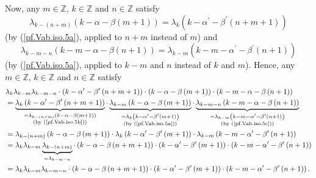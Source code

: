 \documentclass[etingof-lie.tex]{subfiles}
\begin{document}
Now, any $m\in\mathbb{Z}$, $k\in\mathbb{Z}$ and $n\in\mathbb{Z}$ satisfy%
\begin{equation}
\lambda_{k-\left(  n+m\right)  }\left(  k-\alpha-\beta\left(  m+1\right)
\right)  =\lambda_{k}\left(  k-\alpha^{\prime}-\beta^{\prime}\left(
n+m+1\right)  \right)  \label{pf.Vab.iso.5b}%
\end{equation}
(by (\ref{pf.Vab.iso.5a}), applied to $n+m$ instead of $m$) and%
\begin{equation}
\lambda_{k-m-n}\left(  k-m-\alpha-\beta\left(  n+1\right)  \right)
=\lambda_{k-m}\left(  k-m-\alpha^{\prime}-\beta^{\prime}\left(  n+1\right)
\right)  \label{pf.Vab.iso.5c}%
\end{equation}
(by (\ref{pf.Vab.iso.5a}), applied to $k-m$ and $n$ instead of $k$ and $m$).
Hence, any $m\in\mathbb{Z}$, $k\in\mathbb{Z}$ and $n\in\mathbb{Z}$ satisfy
\begin{align*}
&  \lambda_{k}\lambda_{k-m}\lambda_{k-m-n}\cdot\left(  k-\alpha^{\prime}%
-\beta^{\prime}\left(  n+m+1\right)  \right)  \cdot\left(  k-\alpha
-\beta\left(  m+1\right)  \right)  \cdot\left(  k-m-\alpha-\beta\left(
n+1\right)  \right) \\
&  =\underbrace{\lambda_{k}\left(  k-\alpha^{\prime}-\beta^{\prime}\left(
n+m+1\right)  \right)  }_{\substack{=\lambda_{k-\left(  n+m\right)  }\left(
k-\alpha-\beta\left(  m+1\right)  \right)  \\\text{(by (\ref{pf.Vab.iso.5b}%
))}}}\cdot\underbrace{\lambda_{k-m}\left(  k-\alpha-\beta\left(  m+1\right)
\right)  }_{\substack{=\lambda_{k}\left(  k-\alpha^{\prime}-\beta^{\prime
}\left(  m+1\right)  \right)  \\\text{(by (\ref{pf.Vab.iso.5a}))}}%
}\cdot\underbrace{\lambda_{k-m-n}\left(  k-m-\alpha-\beta\left(  n+1\right)
\right)  }_{\substack{=\lambda_{k-m}\left(  k-m-\alpha^{\prime}-\beta^{\prime
}\left(  n+1\right)  \right)  \\\text{(by (\ref{pf.Vab.iso.5c}))}}}\\
&  =\lambda_{k-\left(  n+m\right)  }\left(  k-\alpha-\beta\left(  m+1\right)
\right)  \cdot\lambda_{k}\left(  k-\alpha^{\prime}-\beta^{\prime}\left(
m+1\right)  \right)  \cdot\lambda_{k-m}\left(  k-m-\alpha^{\prime}%
-\beta^{\prime}\left(  n+1\right)  \right) \\
&  =\lambda_{k}\lambda_{k-m}\underbrace{\lambda_{k-\left(  n+m\right)  }%
}_{=\lambda_{k-m-n}}\cdot\left(  k-\alpha-\beta\left(  n+m+1\right)  \right)
\cdot\left(  k-\alpha^{\prime}-\beta^{\prime}\left(  m+1\right)  \right)
\cdot\left(  k-m-\alpha^{\prime}-\beta^{\prime}\left(  n+1\right)  \right) \\
&  =\lambda_{k}\lambda_{k-m}\lambda_{k-m-n}\cdot\left(  k-\alpha-\beta\left(
n+m+1\right)  \right)  \cdot\left(  k-\alpha^{\prime}-\beta^{\prime}\left(
m+1\right)  \right)  \cdot\left(  k-m-\alpha^{\prime}-\beta^{\prime}\left(
n+1\right)  \right)  .
\end{align*}
\end{document}
